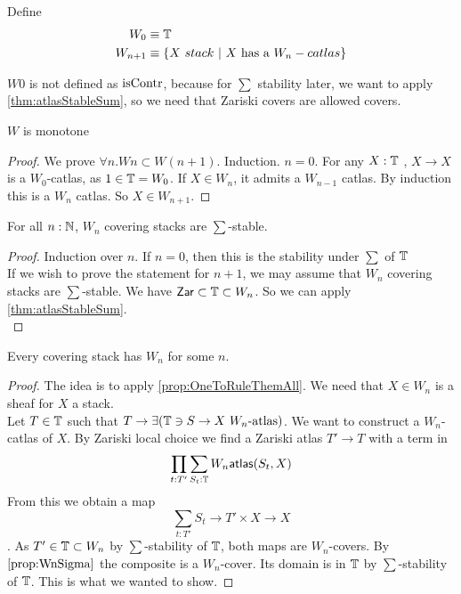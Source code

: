 \begin{definition}
	Define \begin{align*}
		W_0 &\equiv \mathbb{T} \\
		W_{n+1} &\equiv \{X \ stack \ | \  X \text{ has a } W_n-catlas \}
	\end{align*}
\end{definition}
\begin{why}
	$W 0 $ is not defined as $\operatorname{isContr}$, because for $\sum$ stability later, we want to apply \ref{thm:atlasStableSum}, so we need that Zariski covers are allowed covers.
\end{why}
\begin{lemma}
	$W$  is monotone
\end{lemma}
\begin{proof}
	We prove $\forall n . W n \subset W (n+1)$.
	Induction. $n = 0$. For any $X :\mathbb{T}$ , $ X \to X$ is a $W_0$-catlas, as $1 \in \mathbb{T} = W_0$. If $X \in W_n$, it admits a $W_{n-1}$ catlas. By induction this is a $W_n$ catlas. So $X \in W_{n+1}$.
\end{proof}
\begin{lemma}{\label{prop:WnSigma}}
	For all $n : \mathbb{N}$, $W_n$ covering stacks are $\sum$-stable. \\
\end{lemma}
\begin{proof}	
	Induction over $n$. If $n = 0$, then this is the stability under $\sum$ of $\mathbb{T}$ \\
	If we wish to prove the statement for $n+1$, we may assume that $W_n$ covering stacks are $\sum$-stable. We have $\mathsf{Zar} \subset \mathbb{T} \subset W_n$. So we can apply \ref{thm:atlasStableSum}. \\
\end{proof}	
\begin{prop}{\label{prop:WTrunc}}
	Every covering stack has $W_n$ for some $n$.
\end{prop}
\begin{proof}
	The idea is to apply \ref{prop:OneToRuleThemAll}.
	We need that $X \in W_n$ is a sheaf for $X$ a stack. \\
	Let $T \in \mathbb{T}$ such that $T \to \exists (\mathbb{T} \ni S \to X \ W_n \text{-atlas})$. We want to construct a $W_n$-catlas of $X$. By Zariski local choice we find a Zariski atlas $T' \to T$ with a term in 
	\[\prod_{t : T'} \sum_{S_t : \mathbb{T}} W_n \mathsf{atlas} (S_t , X) \]
	 From this we obtain a map 
	 \[\sum_{t : T'} S_t \to T' \times X \to X\].  As $T' \in \mathbb{T} \subset W_n$ by $\sum$-stability of $\mathbb{T}$, both maps are $W_n$-covers. By $\ref{prop:WnSigma}$ the composite is a $W_n$-cover. Its domain is in $\mathbb{T}$ by $\sum$-stability of $\mathbb{T}$. This is what we wanted to show.
\end{proof}

